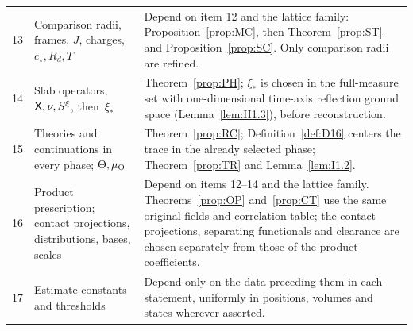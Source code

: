 \begin{longtable}{@{}p{}p{}p{}@{}}
13 & \raggedright Comparison radii, frames, $J$, charges, $c_\star,R_d,T$ & Depend on item 12 and the lattice family: Proposition~\ref{prop:MC}, then Theorem~\ref{prop:ST} and Proposition~\ref{prop:SC}. Only comparison radii are refined.\\[3pt]
14 & \raggedright Slab operators, $\mathsf{X},\nu,S^\xi$, then~$\xi_*$ & Theorem~\ref{prop:PH}; $\xi_*$ is chosen in the full-measure set with one-dimensional time-axis reflection ground space (Lemma~\ref{lem:H1.3}), before reconstruction.\\[3pt]
15 & \raggedright Theories and continuations in every phase; $\Theta,\mu_{\Theta}$ & Theorem~\ref{prop:RC}; Definition~\ref{def:D16} centers the trace in the already selected phase; Theorem~\ref{prop:TR} and Lemma~\ref{lem:I1.2}.\\[3pt]
16 & \raggedright Product prescription; contact projections, distributions, bases, scales & Depend on items 12--14 and the lattice family. Theorems~\ref{prop:OP} and~\ref{prop:CT} use the same original fields and correlation table; the contact projections, separating functionals and clearance are chosen separately from those of the product coefficients.\\[3pt]
17 & \raggedright Estimate constants and thresholds & Depend only on the data preceding them in each statement, uniformly in positions, volumes and states wherever asserted.\\
\end{longtable}
\endgroup
